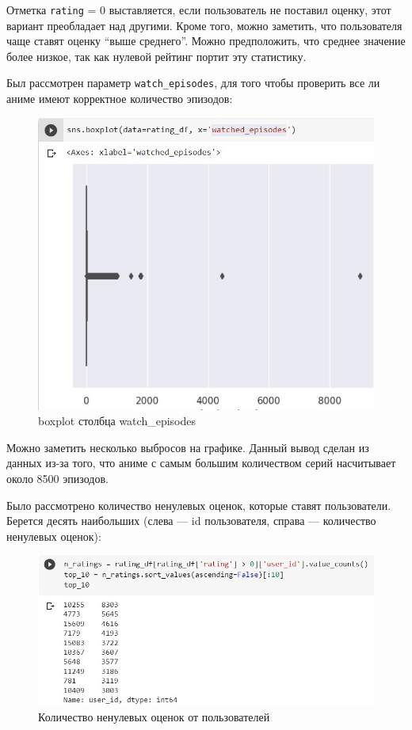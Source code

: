 \documentclass[bachelor, och, diploma]{SCWorks}
\begin{document}
Отметка \verb|rating| = 0 выставляется, если пользователь не поставил оценку, этот вариант преобладает над другими. Кроме того, можно заметить,
 что пользователя чаще ставят оценку ``выше среднего''. Можно предположить, что среднее значение более низкое, так как нулевой рейтинг портит эту статистику.

Был рассмотрен параметр \verb|watch_episodes|, для того чтобы проверить все ли аниме имеют корректное количество эпизодов:

\begin{figure}[ht]

	\centering
	
	\includegraphics[width=0.8\linewidth]{analis4.png}
	
	\caption{boxplot столбца watch\_episodes}
	
	\label{fig:a4}
	
\end{figure}


Можно заметить несколько выбросов на графике. Данный вывод сделан из данных из-за того, что аниме с самым большим количеством серий насчитывает около 8500 эпизодов.

Было рассмотрено количество ненулевых оценок, которые ставят пользователи.
 Берется десять наибольших (слева --- id пользователя, справа --- количество ненулевых оценок):

 \begin{figure}[H]

	\centering
	
	\includegraphics[width=0.8\linewidth]{analis5.png}
	
	\caption{Количество ненулевых оценок от пользователей}
	
	\label{fig:a5}
	
\end{figure}
\end{document}

